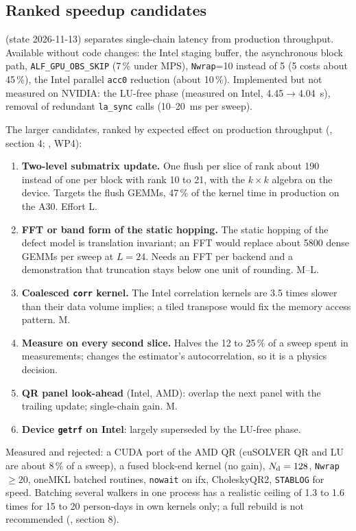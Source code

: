 \subsection{Ranked speedup candidates}

 (state 2026-11-13) separates single-chain latency from production throughput. Available without code changes: the Intel staging buffer, the asynchronous block path, \texttt{ALF\_GPU\_OBS\_SKIP} (7\,\% under MPS), \texttt{Nwrap}=10 instead of 5 (5 costs about 45\,\%), the Intel parallel \texttt{acc0} reduction (about 10\,\%). Implemented but not measured on NVIDIA: the LU-free phase (measured on Intel, 4.45$\to$4.04~s), removal of redundant \texttt{la\_sync} calls (10--20~ms per sweep). %

The larger candidates, ranked by expected effect on production throughput (, section 4; , WP4):
\begin{enumerate}
\item \textbf{Two-level submatrix update.} One flush per slice of rank about 190 instead of one per block with rank 10 to 21, with the $k\times k$ algebra on the device. Targets the flush GEMMs, 47\,\% of the kernel time in production on the A30. Effort L.
\item \textbf{FFT or band form of the static hopping.} The static hopping of the defect model is translation invariant; an FFT would replace about 5800 dense GEMMs per sweep at $L=24$. Needs an FFT per backend and a demonstration that truncation stays below one unit of rounding. M--L.
\item \textbf{Coalesced \texttt{corr} kernel.} The Intel correlation kernels are 3.5 times slower than their data volume implies; a tiled transpose would fix the memory access pattern. M.
\item \textbf{Measure on every second slice.} Halves the 12 to 25\,\% of a sweep spent in measurements; changes the estimator's autocorrelation, so it is a physics decision.
\item \textbf{QR panel look-ahead} (Intel, AMD): overlap the next panel with the trailing update; single-chain gain. M.
\item \textbf{Device \texttt{getrf} on Intel}: largely superseded by the LU-free phase.
\end{enumerate}
Measured and rejected: a CUDA port of the AMD QR (cuSOLVER QR and LU are about 8\,\% of a sweep), a fused block-end kernel (no gain), $N_{\rm d}=128$, \texttt{Nwrap}$\ge20$, oneMKL batched routines, \texttt{nowait} on ifx, CholeskyQR2, \texttt{STABLOG} for speed. Batching several walkers in one process has a realistic ceiling of 1.3 to 1.6 times for 15 to 20 person-days in own kernels only; a full rebuild is not recommended (, section 8). %
